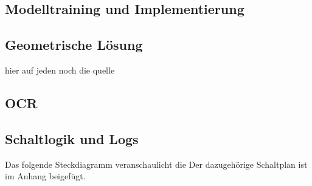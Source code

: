 \subsection{Modelltraining und Implementierung}

\subsection{Geometrische Lösung}
hier auf jeden noch die quelle 

\subsection{OCR}

\subsection{Schaltlogik und Logs}

Das folgende Steckdiagramm veranschaulicht die 
Der dazugehörige Schaltplan ist im Anhang beigefügt.

\nocite{*}
